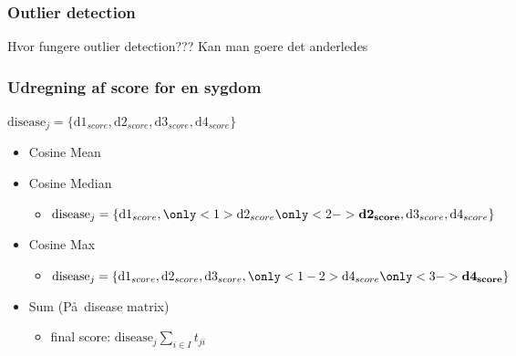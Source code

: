 \documentclass[xcolor=table]{beamer}
\begin{document}
\begin{frame}

  \frametitle{Outlier detection}

  Hvor fungere outlier detection??? Kan man goere det anderledes

\end{frame}

\begin{frame}

  \frametitle{Udregning af score for en sygdom}
  
  $ \textrm{disease}_j = \{\textrm{d1}_{score}, \textrm{d2}_{score}, \textrm{d3}_{score}, \textrm{d4}_{score} \} $

  \begin{itemize}
    \item Cosine Mean
      \begin{itemize}
      \end{itemize}
    \item Cosine Median
      \begin{itemize}
        \item $ \textrm{disease}_j = \{\textrm{d1}_{score}, \only<1>{\textrm{d2}_{score}} \only<2->{\textbf{d2}_{\mathbf{score}}}, \textrm{d3}_{score}, \textrm{d4}_{score} \} $
      \end{itemize}
    \item Cosine Max
      \begin{itemize}
        \item $ \textrm{disease}_j = \{\textrm{d1}_{score}, \textrm{d2}_{score}, \textrm{d3}_{score}, \only<1-2>{\textrm{d4}_{score}} \only<3->{\textbf{d4}_{\mathbf{score}}} \} $
      \end{itemize}
    \item Sum (P\aa\ disease matrix)
      \begin{itemize}
        \item final score: $\textrm{disease}_j \sum_{i \in I} t_{ji} $
      \end{itemize}
  \end{itemize}

\end{frame}
\end{document}
